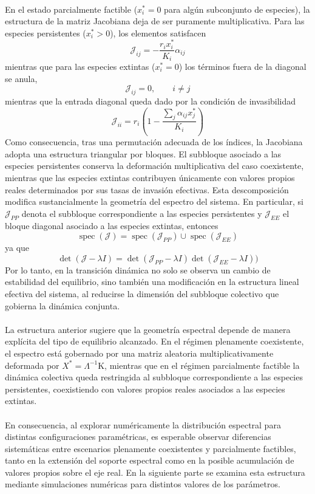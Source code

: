 \\
En el estado parcialmente factible ($x_i^*=0$ para algún subconjunto de especies), la estructura de la matriz Jacobiana deja de ser puramente multiplicativa. Para las especies persistentes ($x_i^*>0$), los elementos satisfacen 
$$\mathcal{J}_{ij}=-\frac{r_ix_i^*}{K_i}\alpha_{ij}$$
mientras que para las especies extintas ($x_i^*=0$) los términos fuera de la diagonal se anula,
$$\mathcal{J}_{ij}=0,\qquad i\neq j$$
mientras que la entrada diagonal queda dado por la condición de invasibilidad
$$\mathcal{J}_{ii}=r_i\left (1-\frac{\sum_j\alpha_{ij}x_j^*}{K_i}\right )$$
Como consecuencia, tras una permutación adecuada de los índices, la Jacobiana adopta una estructura triangular por bloques. El subbloque asociado a las especies persistentes conserva la deformación multiplicativa del caso coexistente, mientras que las especies extintas contribuyen únicamente con valores propios reales determinados por sus tasas de invasión efectivas. Esta descomposición modifica sustancialmente la geometría del espectro del sistema. En particular, si $\mathcal{J}_{PP}$ denota el subbloque correspondiente a las especies persistentes y $\mathcal{J}_{EE}$ el bloque diagonal asociado a las especies extintas, entonces $$\operatorname{spec}(\mathcal{J})=\operatorname{spec}(\mathcal{J}_{PP})\cup\operatorname{spec}(\mathcal{J}_{EE})$$ 
ya que 
$$\det(\mathcal{J}-\lambda I)=\det(\mathcal{J}_{PP}-\lambda I)\det(\mathcal{J}_{EE}-\lambda I))$$
Por lo tanto, en la transición dinámica no solo se observa un cambio de estabilidad del equilibrio, sino también una modificación en la estructura lineal efectiva del sistema, al reducirse la dimensión del subbloque colectivo que gobierna la dinámica conjunta.\\
\\
La estructura anterior sugiere que la geometría espectral depende de manera explícita del tipo de equilibrio alcanzado. En el régimen plenamente coexistente, el espectro está gobernado por una matriz aleatoria multiplicativamente deformada por $X^*=\Lambda^{-1}\mathrm{K}$, mientras que en el régimen parcialmente factible la dinámica colectiva queda restringida al subbloque correspondiente a las especies persistentes, coexistiendo con valores propios reales asociados a las especies extintas.\\
\\
En consecuencia, al explorar numéricamente la distribución espectral para distintas configuraciones paramétricas, es esperable observar diferencias sistemáticas entre escenarios plenamente coexistentes y parcialmente factibles, tanto en la extensión del soporte espectral como en la posible acumulación de valores propios sobre el eje real. En la siguiente parte se examina esta estructura mediante simulaciones numéricas para distintos valores de los parámetros.
\newpage
